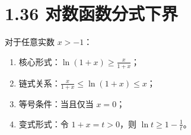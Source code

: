 \documentclass{article}
\begin{document}
\section*{1.36 对数函数分式下界}
对于任意实数 \( x > -1 \)：
\begin{enumerate}
    \item 核心形式：\( \ln(1+x) \geq \frac{x}{1+x} \)；
    \item 链式关系：\( \frac{x}{1+x} \leq \ln(1+x) \leq x \)；
    \item 等号条件：当且仅当 \( x=0 \)；
    \item 变式形式：令 \( 1+x=t>0 \)，则 \( \ln t \geq 1-\frac{1}{t} \)。
\end{enumerate}
\end{document}

